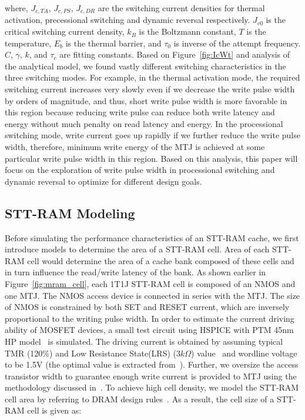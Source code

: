 where, $J_{c,TA}$, $J_{c,PS}$, $J_{c,DR}$ are the switching current densities for thermal activation,
precessional switching and dynamic reversal respectively. $J_{c0}$ is the critical switching current
density, $k_{B}$ is the Boltzmann constant, $T$ is the temperature, $E_{b}$ is the thermal barrier,
and $\tau_{0}$ is inverse of the attempt frequency. $C$, $\gamma$, $k$, and $\tau_{c}$ are fitting
constants. Based on Figure~\ref{fig:IcWt} and analysis of the analytical model, we found vastly
different switching characteristics in the three switching modes. For example, in the thermal
activation mode, the required switching current increases very slowly even if we decrease the write
pulse width by orders of magnitude, and thus, short write pulse width is more favorable in this
region because reducing write pulse can reduce both write latency and energy without much penalty on
read latency and energy. In the processional switching mode, write current goes up rapidly if we
further reduce the write pulse width, therefore, minimum write energy of the MTJ is achieved at some
particular write pulse width in this region. Based on this analysis, this paper will focus on the
exploration of write pulse width in processional switching and dynamic reversal to optimize for
different design goals.

\subsection{STT-RAM Modeling}

Before simulating the performance characteristics of an STT-RAM cache, we first introduce models to
determine the area of a STT-RAM cell. Area of each STT-RAM cell would determine the area of a cache
bank composed of these cells and in turn influence the read/write latency of the bank. As shown
earlier in Figure~\ref{fig:mram_cell}, each 1T1J STT-RAM cell is composed of an NMOS and one MTJ. The
NMOS access device is connected in series with the MTJ. The size of NMOS is constrained by both SET
and RESET current, which are inversely proportional to the writing pulse width. In order to estimate
the current driving ability of MOSFET devices, a small test circuit using HSPICE with PTM 45nm HP
model~\cite{PTM} is simulated. The driving current is obtained by assuming typical TMR (120\%) and
Low Resistance State(LRS) ($3k\Omega$) value~\cite{STTRAM:Qualcomm09} and wordline voltage to be 1.5V (the optimal value is
extracted from~\cite{STTRAM:Gatech10}). Further, we oversize the access transistor width to guarantee
enough write current is provided to MTJ using the methodology discussed in~\cite{STTRAM:RPI10}. To
achieve high cell density, we model the STT-RAM cell area by referring to DRAM design
rules~\cite{DRAM:6F2}.  As a result, the cell size of a STT-RAM cell is given as:

